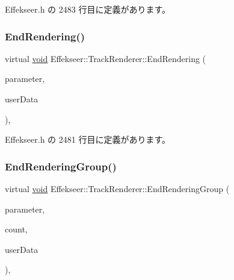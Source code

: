  Effekseer.\+h の 2483 行目に定義があります。

\mbox{\label{class_effekseer_1_1_track_renderer_ad8ad4cbe8cdbbaacc2106c3e689ce579}} 
\subsubsection{\texorpdfstring{End\+Rendering()}{EndRendering()}}
{\footnotesize\ttfamily virtual \mbox{\hyperlink{namespace_effekseer_ab34c4088e512200cf4c2716f168deb56}{void}} Effekseer\+::\+Track\+Renderer\+::\+End\+Rendering (\begin{DoxyParamCaption}\item[{const \mbox{\hyperlink{struct_effekseer_1_1_track_renderer_1_1_node_parameter}{Node\+Parameter}} \&}]{parameter,  }\item[{\mbox{\hyperlink{namespace_effekseer_ab34c4088e512200cf4c2716f168deb56}{void}} $\ast$}]{user\+Data }\end{DoxyParamCaption})\hspace{0.3cm}{\ttfamily [inline]}, {\ttfamily [virtual]}}



 Effekseer.\+h の 2481 行目に定義があります。

\mbox{\label{class_effekseer_1_1_track_renderer_a3f64ad809595ff880d3575ed8345ef0a}} 
\subsubsection{\texorpdfstring{End\+Rendering\+Group()}{EndRenderingGroup()}}
{\footnotesize\ttfamily virtual \mbox{\hyperlink{namespace_effekseer_ab34c4088e512200cf4c2716f168deb56}{void}} Effekseer\+::\+Track\+Renderer\+::\+End\+Rendering\+Group (\begin{DoxyParamCaption}\item[{const \mbox{\hyperlink{struct_effekseer_1_1_track_renderer_1_1_node_parameter}{Node\+Parameter}} \&}]{parameter,  }\item[{int32\+\_\+t}]{count,  }\item[{\mbox{\hyperlink{namespace_effekseer_ab34c4088e512200cf4c2716f168deb56}{void}} $\ast$}]{user\+Data }\end{DoxyParamCaption})\hspace{0.3cm}{\ttfamily [inline]}, {\ttfamily [virtual]}}



